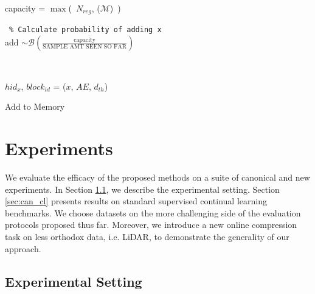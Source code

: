 \documentclass[colorinlistoftodos]{article} %
\begin{document}
\begin{minipage}{\textwidth}
\begin{minipage}{0.5\textwidth}
\begin{algorithm2e}[H]
    capacity = $\max$(\ $N_{reg}$, ($\mathcal{M}$)\ ) 
    
     \,\,\,\texttt{\% Calculate probability of adding x} \\
    add $\sim \mathcal{B}(\frac{\text{capacity}}{\text{SAMPLE AMT SEEN SO FAR}})$
    
    \,\,
    {
        $hid_x$, $block_{id}$ = ($x$, $AE$, $d_{th}$) \\
        
    }
    

 
 \caption{Add to Memory}
\label{algo:vqr}
\end{algorithm2e}
\end{minipage}
\end{minipage}
\section{Experiments}

We evaluate the efficacy of the proposed methods on a suite of canonical and new experiments. In Section \ref{sec:exp_details}, we describe the experimental setting. Section \ref{sec:can_cl} presents results on standard supervised continual learning benchmarks. We choose datasets on the more challenging side of the evaluation protocols proposed thus far. Moreover, we introduce a new online compression task on less orthodox data, i.e. LiDAR, to demonstrate the generality of our approach.

\subsection{Experimental Setting}
\label{sec:exp_details}
\end{document}
